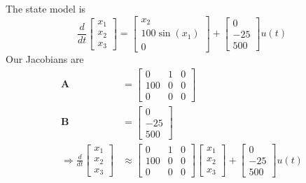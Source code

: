 \documentclass[]{article}
\newcommand{\diff}[1]{\frac{d}{d #1}}
\begin{document}
The state model is
\begin{equation}
	\diff{t} \begin{bmatrix}
	x_1 \\
	x_2 \\
	x_3
	\end{bmatrix} =
	\begin{bmatrix}
	x_2 \\
	100 \sin(x_1) \\
	0
	\end{bmatrix} +
	\begin{bmatrix}
	0 \\
	-25 \\
	500
	\end{bmatrix} u(t)
\end{equation}
Our Jacobians are
\begin{align}
	\bm{A} &=
	\begin{bmatrix}
	0 & 1 & 0 \\
	100 & 0 & 0 \\
	0 & 0 & 0
	\end{bmatrix} \\
	\bm{B} &=
	\begin{bmatrix}
	0 \\
	-25 \\
	500
	\end{bmatrix} \\
	\Rightarrow \diff{t} \begin{bmatrix}
	x_1 \\
	x_2 \\
	x_3
	\end{bmatrix} &\approx
	\begin{bmatrix}
	0 & 1 & 0 \\
	100 & 0 & 0 \\
	0 & 0 & 0
	\end{bmatrix}
	\begin{bmatrix}
	x_1 \\
	x_2 \\
	x_3
	\end{bmatrix} +
	\begin{bmatrix}
	0 \\
	-25 \\
	500
	\end{bmatrix} u(t)
\end{align}

\subsection{}
\end{document}
